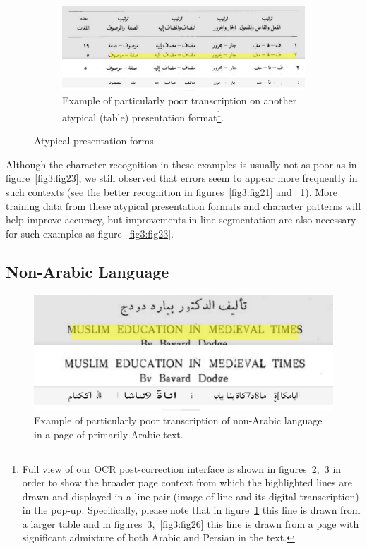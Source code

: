 \begin{figure}
\begin{subfigure}[t]{0.48\linewidth}
	\centering
	\includegraphics[width=\textwidth]{images/image11.png}
	\caption{Example of particularly poor transcription on another atypical
(table) presentation format\footnote{Full view of our OCR post-correction
interface is shown in figures~\ref{fig3:fig2124},~\ref{fig3:fig25} in order to
show the broader page context from which the highlighted lines are drawn and
displayed in a line pair (image of line and its digital transcription) in the
pop-up. Specifically, please note that in figure~\ref{fig3:fig24} this line is
drawn from a larger table and in figures~\ref{fig3:fig25},~\ref{fig3:fig26} this line is
drawn from a page with significant admixture of both Arabic and Persian in the
text.}.}
	\label{fig3:fig24}
	\end{subfigure}
	\caption{Atypical presentation forms}
	\label{fig3:fig2124}
\end{figure}

Although the character recognition in these examples is usually not as poor as
in figure~\ref{fig3:fig23}, we still observed that errors seem to appear more
frequently in such contexts (see the better recognition in
figures~\ref{fig3:fig21} and ~\ref{fig3:fig24}). More training data from these
atypical presentation formats and character patterns will help improve
accuracy, but improvements in line segmentation are also necessary for such
examples as figure~\ref{fig3:fig23}.

\subsection{Non-Arabic Language}

\begin{figure}[H]
	\centering
	\includegraphics[width=0.7\linewidth]{images/image12.png}
	\caption{Example of particularly poor transcription of non-Arabic language in a page of primarily Arabic text.}
	\label{fig3:fig25}
\end{figure}


